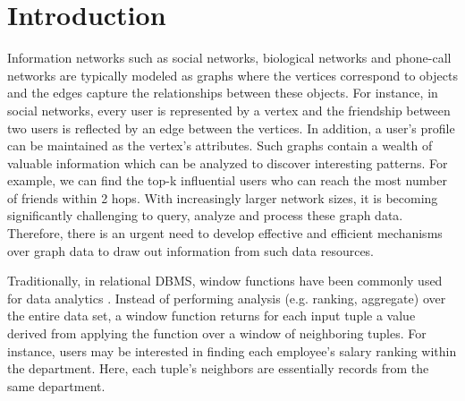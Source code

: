 \section{Introduction}
Information networks such as social networks, biological networks and
phone-call networks are typically modeled as graphs \cite{chen2008graph}
where the vertices correspond to objects and the edges
capture the relationships between these objects.
For instance, in social networks, every user is represented by
a vertex and the friendship between two users is reflected by an edge between
the vertices. In addition, a user's profile can be maintained as
the vertex's attributes. Such graphs contain a wealth of valuable 
information which can be analyzed to discover interesting patterns. 
For example, we can find the top-k influential users who can 
reach the most number of friends within 2 hops. With increasingly
larger network sizes, it is becoming significantly challenging to 
query, analyze and process these graph data. Therefore, there is an urgent need 
to develop effective and efficient mechanisms over graph data to draw out
information from such data resources.
 
Traditionally, in relational DBMS, window functions have been commonly
used for data analytics \cite{cao2012optimization, bellamkonda2013adaptive}. Instead of performing analysis (e.g. ranking, 
aggregate) over the entire data set, a window function returns for each 
input tuple a value derived from applying the function over a window of 
neighboring tuples. For instance, users may be interested in finding 
each employee's salary ranking within the department. Here,
each tuple's neighbors are essentially records from the same department.


